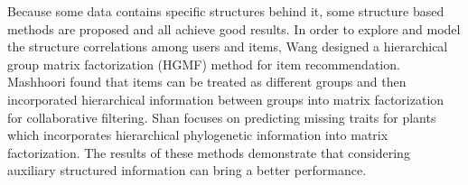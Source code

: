 \documentclass{bmcart}
\begin{document}
 Because some data contains specific structures behind it, some structure based methods are proposed and all achieve good results. In order to explore and model the structure correlations among users and items, Wang \cite{Wang2014} designed a hierarchical group matrix factorization (HGMF) method for item recommendation.
Mashhoori \cite{AliMashhoori2012} found that items can be treated as different groups and then incorporated  hierarchical information between groups into matrix factorization for collaborative filtering.
Shan \cite{Shan2012} focuses on predicting missing traits for plants which incorporates hierarchical phylogenetic information into matrix factorization. The results of these methods demonstrate that considering auxiliary structured information can bring a better performance.
\end{document}
